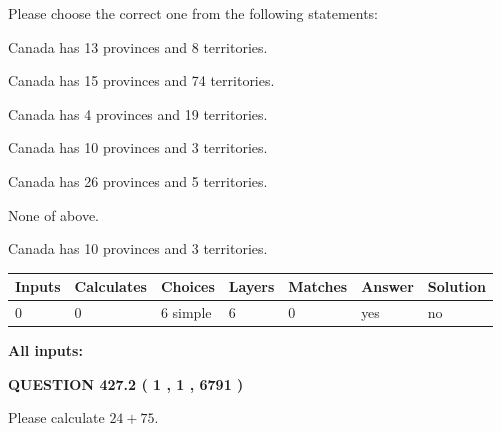 \documentclass[12pt]{article}
\begin{document}
  
Please choose the correct one from the following statements:
 
 
Canada has  13 provinces and  8 territories.
 
 
Canada has  15 provinces and  74 territories.
 
 
Canada has   4 provinces and  19 territories.
 
 
Canada has 10  provinces and 3 territories.
 
 
Canada has  26 provinces and  5 territories.
 
 
 None of above.
 
 
\noindent{}
 
 
Canada has 10  provinces and 3 territories.
 
 
\noindent{}
 
 
   
   
   
   
\noindent\begin{tabular}{|l|l|l|l|l|l|l|}
 \hline
Inputs & Calculates & Choices & Layers & Matches & Answer & Solution \\ \hline
 0  & 
 0  & 
 6
  simple  
  & 
 6  & 
 0  & 
  yes & 
  no 
  \\ \hline
 \end{tabular}
   
   
   
   
\noindent{}
   
   
   
   
\noindent\vspace{0.1in}\hspace{-0.08in} {\textbf{\Large{All inputs: }}}
   
   
  
\vspace{0.2in}
  
{\textbf{\Large{QUESTION
427.2 
 ( 1 , 1 , 6791 )
}}}
  
  
 
Please calculate $ %
24 +  %
75 $.
 
 
 
\end{document}
